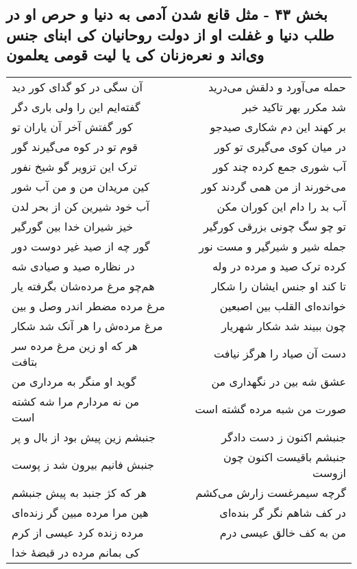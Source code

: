\begin{center}
\section*{بخش ۴۳ - مثل قانع شدن آدمی به دنیا و حرص او در طلب دنیا و غفلت او از دولت روحانیان کی ابنای جنس وی‌اند و نعره‌زنان کی  یا لیت قومی یعلمون}
\label{sec:sh043}
\begin{longtable}{l p{0.5cm} r}
آن سگی در کو گدای کور دید
&&
حمله می‌آورد و دلقش می‌درید
\\
گفته‌ایم این را ولی باری دگر
&&
شد مکرر بهر تاکید خبر
\\
کور گفتش آخر آن یاران تو
&&
بر کهند این دم شکاری صیدجو
\\
قوم تو در کوه می‌گیرند گور
&&
در میان کوی می‌گیری تو کور
\\
ترک این تزویر گو شیخ نفور
&&
آب شوری جمع کرده چند کور
\\
کین مریدان من و من آب شور
&&
می‌خورند از من همی گردند کور
\\
آب خود شیرین کن از بحر لدن
&&
آب بد را دام این کوران مکن
\\
خیز شیران خدا بین گورگیر
&&
تو چو سگ چونی بزرقی کورگیر
\\
گور چه از صید غیر دوست دور
&&
جمله شیر و شیرگیر و مست نور
\\
در نظاره صید و صیادی شه
&&
کرده ترک صید و مرده در وله
\\
هم‌چو مرغ مرده‌شان بگرفته یار
&&
تا کند او جنس ایشان را شکار
\\
مرغ مرده مضطر اندر وصل و بین
&&
خوانده‌ای القلب بین اصبعین
\\
مرغ مرده‌ش را هر آنک شد شکار
&&
چون ببیند شد شکار شهریار
\\
هر که او زین مرغ مرده سر بتافت
&&
دست آن صیاد را هرگز نیافت
\\
گوید او منگر به مرداری من
&&
عشق شه بین در نگهداری من
\\
من نه مردارم مرا شه کشته است
&&
صورت من شبه مرده گشته است
\\
جنبشم زین پیش بود از بال و پر
&&
جنبشم اکنون ز دست دادگر
\\
جنبش فانیم بیرون شد ز پوست
&&
جنبشم باقیست اکنون چون ازوست
\\
هر که کژ جنبد به پیش جنبشم
&&
گرچه سیمرغست زارش می‌کشم
\\
هین مرا مرده مبین گر زنده‌ای
&&
در کف شاهم نگر گر بنده‌ای
\\
مرده زنده کرد عیسی از کرم
&&
من به کف خالق عیسی درم
\\
کی بمانم مرده در قبضهٔ خدا

\end{longtable}
\end{center}
